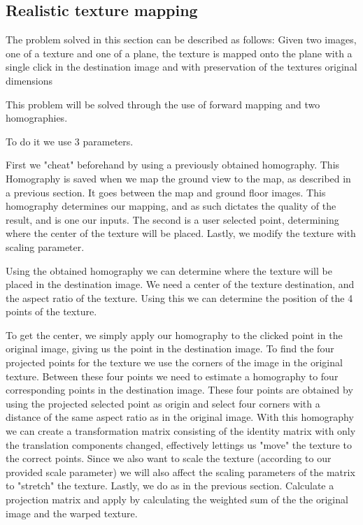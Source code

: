 \subsection{Realistic texture mapping}

The problem solved in this section can be described as follows:
\newline
Given two images, one of a texture and one of a plane, the texture is
mapped onto the plane with a single click in the destination image and with
preservation of the textures original dimensions

This problem will be solved through the use of forward mapping and two
homographies.

To do it we use 3 parameters.

First we "cheat" beforehand by using a previously obtained homography. This
Homography is saved when we map the ground view to the map, as described in
a previous section. It goes between the map and ground floor images. This homography determines our mapping, and as such
dictates the quality of the result, and is one our inputs.
The second is a user selected point, determining where the center of the
texture will be placed. Lastly, we modify the texture with scaling
parameter.

Using the obtained homography we can determine where the texture will be
placed in the destination image. We need a center of the texture
destination, and the aspect ratio of the texture. Using this we can
determine the position of the 4 points of the texture. 

To get the center, we simply apply our homography to the clicked point in the
original image, giving us the point in the destination image. To find the four
projected points for the texture we use the corners of the image in the
original texture. Between these four points we need to estimate a
homography to four corresponding points in the destination image. These four
points are obtained by using the projected selected point as origin and select
four corners with a distance of the same aspect ratio as in the original image.
With this homography we can create a transformation matrix consisting of the
identity matrix with only the translation components changed,
effectively lettings us "move" the texture to the correct points. Since we
also want to scale the texture (according to our provided scale
parameter) we will also affect the scaling parameters of the matrix to
"stretch" the texture. Lastly, we do as in the previous section.
Calculate a projection matrix and apply by calculating the weighted sum of the
the original image and the warped texture.



